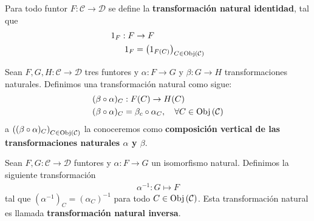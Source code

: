 \documentclass[12pt]{report}
\newcounter{it}
\theoremstyle{largebreak}
\newcommand\cf[3]{\ensuremath{#1:#2\rightarrow#3}}
\newcommand{\Obj}[1]{\ensuremath{\textup{Obj}\left(#1\right)}}
\begin{document}
    \begin{exa}
        Para todo funtor $\cf{F}{\mathcal{C}}{\mathcal{D}}$ se define la \textbf{transformación natural identidad}, tal que
        \begin{equation*}
            \begin{split}
                1_F:F&\rightarrow F\\
                1_F&=\left(1_{ F(C)} \right)_{C\in\Obj{\mathcal{C}}}\\
            \end{split}
        \end{equation*}
    \end{exa}

    \begin{exa}
        Sean $\cf{F,G,H}{\mathcal{C}}{\mathcal{D}}$ tres funtores y $\cf{\alpha}{F}{G}$ y $\cf{\beta}{G}{H}$ transformaciones naturales. Definimos una transformación natural como sigue:
        \begin{equation*}
            \begin{split}
                (\beta\circ\alpha)_C&:F(C)\rightarrow H(C)\\
                (\beta\circ\alpha)_C&=\beta_c\circ\alpha_C,\quad\forall C\in\Obj{\mathcal{C}}\\
            \end{split}
        \end{equation*}
        a $\left((\beta\circ\alpha)_C \right)_{C\in\Obj{\mathcal{C}}}$ la conoceremos como \textbf{composición vertical de las transformaciones naturales $\alpha$ y $\beta$}.
    \end{exa}

    \begin{exa}
        Sean $\cf{F,G}{\mathcal{C}}{\mathcal{D}}$ funtores y $\cf{\alpha}{F}{G}$ un isomorfismo natural. Definimos la siguiente transformación
        \begin{equation*}
            \begin{split}
                \alpha^{-1}:G\mapsto F
            \end{split}
        \end{equation*}
        tal que $(\alpha^{-1})_C=(\alpha_C)^{-1}$ para todo $C\in\Obj{\mathcal{C}}$. Esta transformación natural es llamada \textbf{transformación natural inversa}.
    \end{exa}
\end{document}
